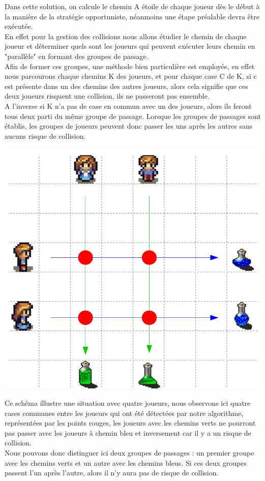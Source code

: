 \documentclass{article}
\begin{document}
	Dans cette solution, on calcule le chemin A étoile de chaque joueur dès le début à la manière de la stratégie opportuniste, néanmoins une étape préalable devra être exécutée.\\
	En effet pour la gestion des collisions nous allons étudier le chemin de chaque joueur et déterminer quels sont les joueurs qui peuvent exécuter leurs chemin en "parallèle" en formant des groupes de passage.\\
	Afin de former ces groupes, une méthode bien particulière est employée, en effet nous parcourons chaque chemins K des joueurs, et pour chaque case C de K, si c est présente dans un des chemins des autres joueurs, alors cela signifie que ces deux joueurs risquent une collision, ils ne passeront pas ensemble.\\
	A l'inverse si K n'a pas de case en commun avec un des joueurs, alors ils feront tous deux parti du même groupe de passage.
	Lorsque les groupes de passages sont établis, les groupes de joueurs peuvent donc passer les uns après les autres sans aucuns risque de collision.
\begin{center}
	\includegraphics[scale=0.25]{Solution2_ex}
\end{center}
	
	Ce schéma illustre une situation avec quatre joueurs, nous observons ici quatre cases communes entre les joueurs qui ont été détectées par notre algorithme, représentées par les points rouges, les joueurs avec les chemins verts ne pourront pas passer avec les joueurs à chemin bleu et inversement car il y a un risque de collision.\\
	Nous pouvons donc distinguer ici deux groupes de passages : un premier groupe avec les chemins verts et un autre avec les chemins bleus.
	Si ces deux groupes passent l'un après l'autre, alors il n'y aura pas de risque de collision.\\
	
\end{document}
